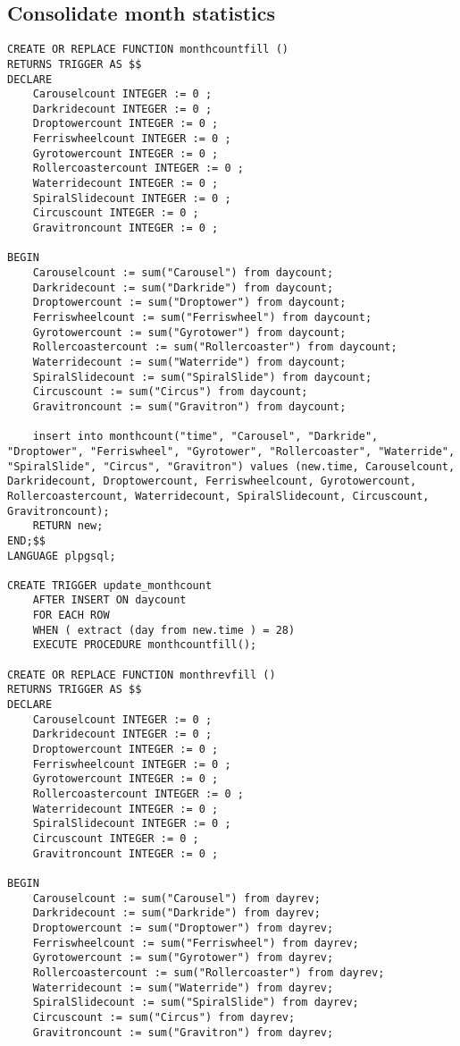 \subsection{Consolidate month statistics}
\begin{verbatim}
CREATE OR REPLACE FUNCTION monthcountfill ()
RETURNS TRIGGER AS $$
DECLARE
    Carouselcount INTEGER := 0 ;
    Darkridecount INTEGER := 0 ;
    Droptowercount INTEGER := 0 ;
    Ferriswheelcount INTEGER := 0 ;
    Gyrotowercount INTEGER := 0 ;
    Rollercoastercount INTEGER := 0 ;
    Waterridecount INTEGER := 0 ;
    SpiralSlidecount INTEGER := 0 ;
    Circuscount INTEGER := 0 ;
    Gravitroncount INTEGER := 0 ;

BEGIN
    Carouselcount := sum("Carousel") from daycount;
    Darkridecount := sum("Darkride") from daycount;
    Droptowercount := sum("Droptower") from daycount;
    Ferriswheelcount := sum("Ferriswheel") from daycount;
    Gyrotowercount := sum("Gyrotower") from daycount;
    Rollercoastercount := sum("Rollercoaster") from daycount;
    Waterridecount := sum("Waterride") from daycount;
    SpiralSlidecount := sum("SpiralSlide") from daycount;
    Circuscount := sum("Circus") from daycount;
    Gravitroncount := sum("Gravitron") from daycount;

    insert into monthcount("time", "Carousel", "Darkride", "Droptower", "Ferriswheel", "Gyrotower", "Rollercoaster", "Waterride", "SpiralSlide", "Circus", "Gravitron") values (new.time, Carouselcount, Darkridecount, Droptowercount, Ferriswheelcount, Gyrotowercount, Rollercoastercount, Waterridecount, SpiralSlidecount, Circuscount, Gravitroncount);
    RETURN new;
END;$$
LANGUAGE plpgsql;

CREATE TRIGGER update_monthcount
    AFTER INSERT ON daycount
    FOR EACH ROW
    WHEN ( extract (day from new.time ) = 28)
    EXECUTE PROCEDURE monthcountfill();

CREATE OR REPLACE FUNCTION monthrevfill ()
RETURNS TRIGGER AS $$
DECLARE
    Carouselcount INTEGER := 0 ;
    Darkridecount INTEGER := 0 ;
    Droptowercount INTEGER := 0 ;
    Ferriswheelcount INTEGER := 0 ;
    Gyrotowercount INTEGER := 0 ;
    Rollercoastercount INTEGER := 0 ;
    Waterridecount INTEGER := 0 ;
    SpiralSlidecount INTEGER := 0 ;
    Circuscount INTEGER := 0 ;
    Gravitroncount INTEGER := 0 ;

BEGIN
    Carouselcount := sum("Carousel") from dayrev;
    Darkridecount := sum("Darkride") from dayrev;
    Droptowercount := sum("Droptower") from dayrev;
    Ferriswheelcount := sum("Ferriswheel") from dayrev;
    Gyrotowercount := sum("Gyrotower") from dayrev;
    Rollercoastercount := sum("Rollercoaster") from dayrev;
    Waterridecount := sum("Waterride") from dayrev;
    SpiralSlidecount := sum("SpiralSlide") from dayrev;
    Circuscount := sum("Circus") from dayrev;
    Gravitroncount := sum("Gravitron") from dayrev;


\end{verbatim}
